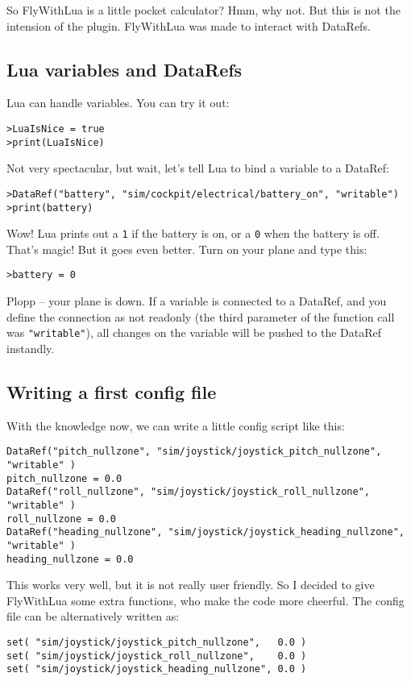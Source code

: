 \documentclass[11pt,parskip=half,a4paper]{scrartcl}
\begin{document}
So FlyWithLua is a little pocket calculator? Hmm, why not. But this is not the intension of the plugin. FlyWithLua was made to interact with DataRefs.

\subsection{Lua variables and DataRefs}

Lua can handle variables. You can try it out:

\verb|>LuaIsNice = true|\\
\verb|>print(LuaIsNice)|

Not very spectacular, but wait, let's tell Lua to bind a variable to a DataRef:

\verb|>DataRef("battery", "sim/cockpit/electrical/battery_on", "writable")|\\
\verb|>print(battery)|

Wow! Lua prints out a \verb|1| if the battery is on, or a \verb|0| when the battery is off. That's magic! But it goes even better. Turn on your plane and type this:

\verb|>battery = 0|

Plopp -- your plane is down. If a variable is connected to a DataRef, and you define the connection as not readonly (the third parameter of the function call was \verb|"writable"|),
all changes on the variable will be pushed to the DataRef instandly.

\subsection{Writing a first config file}

With the knowledge now, we can write a little config script like this:

\begin{lstlisting}
DataRef("pitch_nullzone", "sim/joystick/joystick_pitch_nullzone", "writable" )
pitch_nullzone = 0.0
DataRef("roll_nullzone", "sim/joystick/joystick_roll_nullzone", "writable" )
roll_nullzone = 0.0
DataRef("heading_nullzone", "sim/joystick/joystick_heading_nullzone", "writable" )
heading_nullzone = 0.0
\end{lstlisting}

This works very well, but it is not really user friendly. So I decided to give FlyWithLua some extra functions, who make the code more cheerful. The config file can be alternatively written as:

\begin{lstlisting}
set( "sim/joystick/joystick_pitch_nullzone",   0.0 )
set( "sim/joystick/joystick_roll_nullzone",    0.0 )
set( "sim/joystick/joystick_heading_nullzone", 0.0 )
\end{lstlisting}
\end{document}

